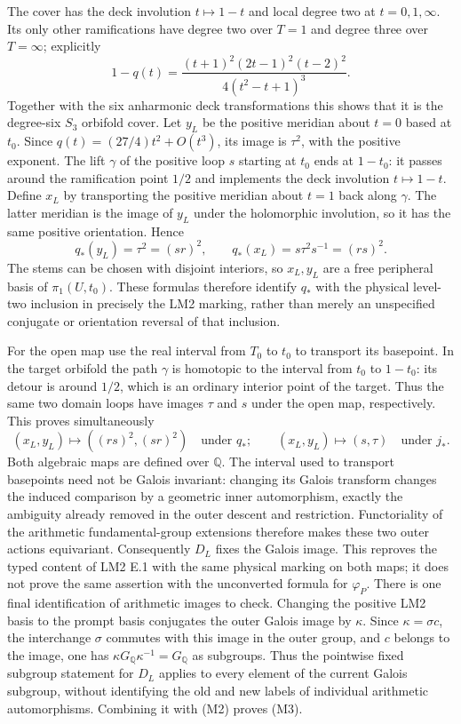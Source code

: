 The cover has the deck involution $t\mapsto1-t$ and local degree
two at $t=0,1,\infty$. Its only other ramifications have degree
two over $T=1$ and degree three over $T=\infty$; explicitly
\[
 1-q(t)=\frac{(t+1)^2(2t-1)^2(t-2)^2}
                  {4(t^2-t+1)^3}.
\]
Together with the six anharmonic deck transformations this shows
that it is the degree-six $S_3$ orbifold cover.
Let $y_L$ be the positive meridian about $t=0$ based at $t_0$.
Since $q(t)=(27/4)t^2+O(t^3)$, its image is $\tau^2$, with the
positive exponent. The lift $\gamma$ of the positive loop $s$
starting at $t_0$ ends at $1-t_0$: it passes around the ramification
point $1/2$ and implements the deck involution $t\mapsto1-t$.
Define $x_L$ by transporting the positive meridian about $t=1$
back along $\gamma$. The latter meridian is the image of $y_L$
under the holomorphic involution, so it has the same positive
orientation. Hence
\[
 q_*(y_L)=\tau^2=(sr)^2,\qquad
 q_*(x_L)=s\tau^2s^{-1}=(rs)^2.
\]
The stems can be chosen with disjoint interiors, so $x_L,y_L$ are
a free peripheral basis of $\pi_1(U,t_0)$. These formulas therefore
identify $q_*$ with the physical level-two inclusion in precisely
the LM2 marking, rather than merely an unspecified conjugate or
orientation reversal of that inclusion.

For the open map use the real interval from $T_0$ to $t_0$ to
transport its basepoint. In the target orbifold the path $\gamma$
is homotopic to the interval from $t_0$ to $1-t_0$: its detour is
around $1/2$, which is an ordinary interior point of the target.
Thus the same two domain loops have images $\tau$ and $s$ under
the open map, respectively. This proves simultaneously
\[
 (x_L,y_L)\longmapsto((rs)^2,(sr)^2)\quad\text{under }q_*;
 \qquad (x_L,y_L)\longmapsto(s,\tau)\quad\text{under }j_*.
\]
Both algebraic maps are defined over $\mathbb Q$. The interval
used to transport basepoints need not be Galois invariant: changing
its Galois transform changes the induced comparison by a geometric
inner automorphism, exactly the ambiguity already removed in the
outer descent and restriction. Functoriality of the arithmetic
fundamental-group extensions therefore makes these two outer
actions equivariant. Consequently $D_L$ fixes the Galois image.
This reproves the typed content of LM2 E.1 with the same physical
marking on both maps; it does not prove the same assertion with
the unconverted formula for $\varphi_P$.
There is one final identification of arithmetic images to check.
Changing the positive LM2 basis to the prompt basis conjugates the
outer Galois image by $\kappa$. Since $\kappa=\sigma c$, the
interchange $\sigma$ commutes with this image in the outer group,
and $c$ belongs to the image, one has
$\kappa G_{\mathbb Q}\kappa^{-1}=G_{\mathbb Q}$ as subgroups.
Thus the pointwise fixed subgroup statement for $D_L$ applies to
every element of the current Galois subgroup, without identifying
the old and new labels of individual arithmetic automorphisms.
Combining it with (M2) proves (M3).

